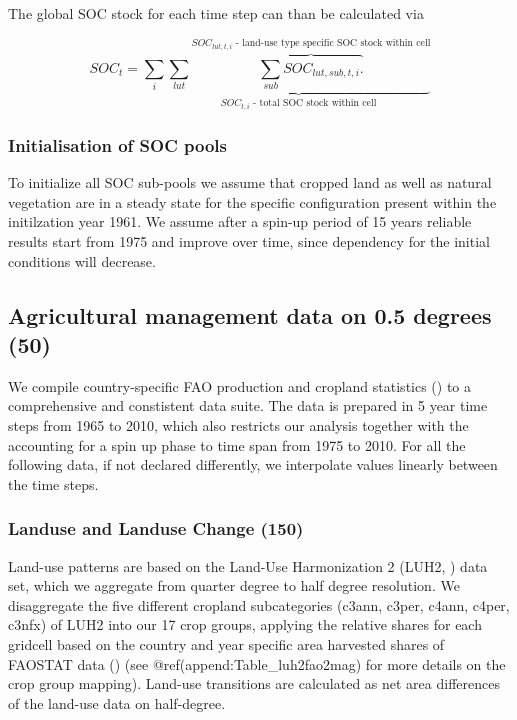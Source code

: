 \documentclass[gc, manuscript]{copernicus}
\begin{document}
The global SOC stock for each time step can than be calculated via

\begin{equation}
SOC_{t} = \sum_{i} \underbrace{\sum_{lut} \overbrace{\sum_{sub} SOC_{lut, sub, t, i}.}^{\text{$SOC_{lut, t, i}$ - land-use type specific SOC stock within cell}}}_{\text{$SOC_{t, i}$ - total SOC stock within cell}}
\label{eq:totalstock}
\end{equation}

\subsubsection{Initialisation of SOC pools}

To initialize all SOC sub-pools we assume that cropped land as well as
natural vegetation are in a steady state for the specific configuration
present within the initilzation year 1961. We assume after a spin-up
period of 15 years reliable results start from 1975 and improve over
time, since dependency for the initial conditions will decrease.

\newpage

\hypertarget{sec:agrimanagement}{%
\subsection{Agricultural management data on 0.5 degrees
(50)}\label{sec:agrimanagement}}

We compile country-specific FAO production and cropland statistics
(\citep{FAOSTAT}) to a comprehensive and constistent data suite. The
data is prepared in 5 year time steps from 1965 to 2010, which also
restricts our analysis together with the accounting for a spin up phase
to time span from 1975 to 2010. For all the following data, if not
declared differently, we interpolate values linearly between the time
steps.

\hypertarget{sec:landuse}{%
\subsubsection{Landuse and Landuse Change (150)}\label{sec:landuse}}

Land-use patterns are based on the Land-Use Harmonization 2 (LUH2,
\citep{LUH2}) data set, which we aggregate from quarter degree to half
degree resolution. We disaggregate the five different cropland
subcategories (c3ann, c3per, c4ann, c4per, c3nfx) of LUH2 into our 17
crop groups, applying the relative shares for each gridcell based on the
country and year specific area harvested shares of FAOSTAT data
(\citep{FAOSTAT}) (see @ref(append:Table\_luh2fao2mag) for more details
on the crop group mapping). Land-use transitions are calculated as net
area differences of the land-use data on half-degree.
\end{document}
